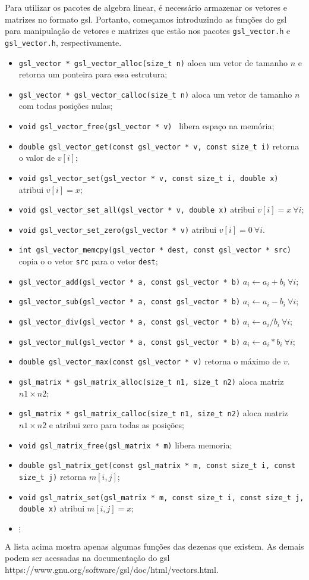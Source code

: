 Para utilizar os pacotes de algebra linear, é necessário armazenar os vetores e matrizes no formato gsl. Portanto, começamos introduzindo as funções do gsl para manipulação de vetores e matrizes que estão nos pacotes \verb|gsl_vector.h| e \verb|gsl_vector.h|, respectivamente.
\begin{itemize}
 \item \verb|gsl_vector * gsl_vector_alloc(size_t n)| aloca um vetor de tamanho $n$ e retorna um ponteira para essa estrutura;
 \item \verb|gsl_vector * gsl_vector_calloc(size_t n)| aloca um vetor de tamanho $n$ com todas posições nulas;
\item \verb|void gsl_vector_free(gsl_vector * v) | libera espaço na memória;
\item \verb|double gsl_vector_get(const gsl_vector * v, const size_t i)| retorna o valor de $v[i]$;
 \item \verb|void gsl_vector_set(gsl_vector * v, const size_t i, double x)| atribui $v[i]=x$;
 \item \verb|void gsl_vector_set_all(gsl_vector * v, double x)|  atribui $v[i]=x\ \forall i$;
 \item \verb|void gsl_vector_set_zero(gsl_vector * v)|  atribui $v[i]=0\ \forall i$.
 \item \verb|int gsl_vector_memcpy(gsl_vector * dest, const gsl_vector * src)| copia o o vetor \verb|src| para o vetor \verb|dest|;
 \item \verb|gsl_vector_add(gsl_vector * a, const gsl_vector * b)| $a_i\leftarrow a_i+b_i\ \forall i$;
 \item \verb|gsl_vector_sub(gsl_vector * a, const gsl_vector * b)| $a_i\leftarrow a_i-b_i\ \forall i$;
 \item \verb|gsl_vector_div(gsl_vector * a, const gsl_vector * b)| $a_i\leftarrow a_i/b_i\ \forall i$;
 \item \verb|gsl_vector_mul(gsl_vector * a, const gsl_vector * b)| $a_i\leftarrow a_i*b_i\ \forall i$;
 \item \verb|double gsl_vector_max(const gsl_vector * v)| retorna o máximo de $v$.
 \item \verb|gsl_matrix * gsl_matrix_alloc(size_t n1, size_t n2)| aloca matriz $n1\times n2$;
 \item \verb|gsl_matrix * gsl_matrix_calloc(size_t n1, size_t n2)| aloca matriz $n1\times n2$ e atribui zero para todas as posições;
 \item \verb|void gsl_matrix_free(gsl_matrix * m)| libera memoria;
 \item \verb|double gsl_matrix_get(const gsl_matrix * m, const size_t i, const size_t j)| retorna $m[i,j]$;
 \item \verb|void gsl_matrix_set(gsl_matrix * m, const size_t i, const size_t j, double x)| atribui $m[i,j]=x$;
 \item $\vdots$
 \end{itemize}
A lista acima mostra apenas algumas funções das dezenas que existem. As demais podem ser acessadas na documentação do gsl https://www.gnu.org/software/gsl/doc/html/vectors.html.

